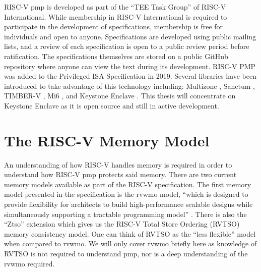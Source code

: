 RISC-V \gls{pmp} is developed as part of the ``TEE Task Group'' of RISC-V International. While membership in RISC-V International is required to participate in the development of specifications, membership is free for individuals and open to anyone. Specifications are developed using public mailing lists, and a review of each specification is open to a public review period before ratification. The specifications themselves are stored on a public GitHub repository where anyone can view the text during its development. RISC-V PMP was added to the Privileged ISA Specification \cite{PrivIsa2019} in 2019. Several libraries have been introduced to take advantage of this technology including: Multizone \cite{pinto2019industry}, Sanctum \cite{Costan2016a}, TIMBER-V \cite{weiser2019timber}, Mi6 \cite{bourgeat2019mi6}, and Keystone Enclave \cite{lee2019keystone, lee2020keystone, cheangverifying}. This thesis will concentrate on Keystone Enclave as it is open source and still in active development.

\section{The RISC-V Memory Model}
An understanding of how RISC-V handles memory is required in order to understand how RISC-V \gls{pmp} protects said memory. There are two current memory models available as part of the RISC-V specification. The first memory model presented in the specification is the \gls{rvwmo} model, ``which is designed to provide flexibility for architects to build high-performance scalable designs while simultaneously supporting a tractable programming model'' \cite{UnprivIsa2019}. There is also the ``Ztso'' extension which gives us the RISC-V Total Store Ordering (RVTSO) memory consistency model. One can think of RVTSO as the ``less flexible'' model when compared to \gls{rvwmo}. We will only cover \gls{rvwmo} briefly here as knowledge of RVTSO is not required to understand \gls{pmp}, nor is a deep understanding of the \gls{rvwmo} required.

